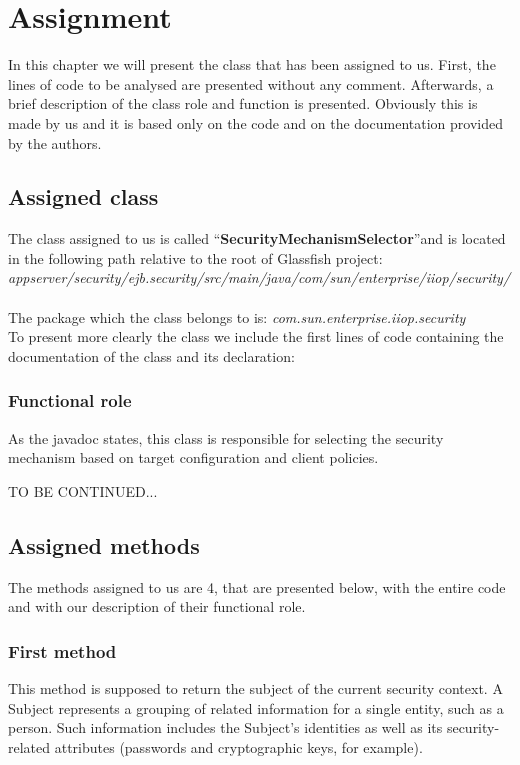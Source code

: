 \documentclass[\mainpath/main]{subfiles}
\begin{document}
\chapter{Assignment} %
\label{Assignment}

\setmyfancystyle

In this chapter we will present the class that has been assigned to us. First, the lines of code to be analysed are presented without any comment. Afterwards, a brief description of the class role and function is presented. Obviously this is made by us and it is based only on the code and on the documentation provided by the authors. 

\section{Assigned class}
\label{Assignment:AssignedClass}
The class assigned to us is called \textquotedblleft \textbf{SecurityMechanismSelector}\textquotedblright and is located in the following path relative to the root of Glassfish project:\\
\textit{
appserver/security/ejb.security/src/main/java/com/sun/enterprise/iiop/security/
}\\ \\
The package which the class belongs to is: \textit{com.sun.enterprise.iiop.security}\\
To present more clearly the class we include the first lines of code containing the documentation of the class and its declaration:


\subsection{Functional role}
As the javadoc states, this class is responsible for selecting the security mechanism based on target configuration and client policies.

TO BE CONTINUED...

\section{Assigned methods}
\label{Assignment:AssignedMethods}
The methods assigned to us are 4, that are presented below, with the entire code and with our description of their functional role.

\subsection{First method}
\label{Assignment:AssignedMethods:FirstMethod}
This method is supposed to return the subject of the current security context. A Subject represents a grouping of related information for a single entity, such as a person. Such information includes the Subject's identities as well as its security-related attributes (passwords and cryptographic keys, for example).
\end{document}
